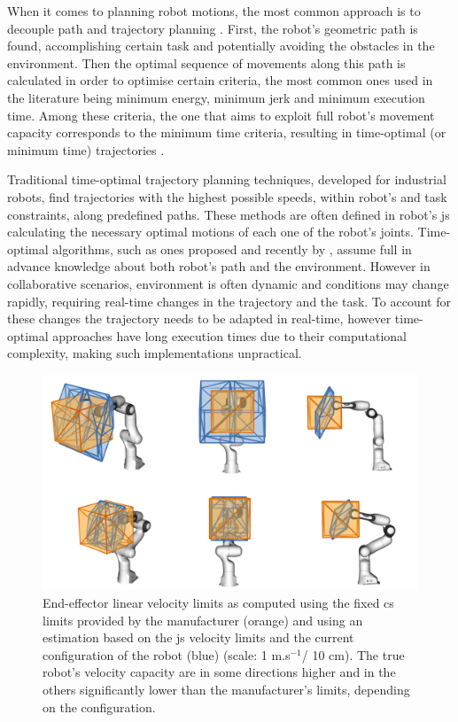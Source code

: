 
When it comes to planning robot motions, the most common approach is to decouple path and trajectory planning \cite{Pardo1996}. First, the robot's geometric path is found, accomplishing certain task and potentially avoiding the obstacles in the environment. Then the optimal sequence of movements along this path is calculated in order to optimise certain criteria, the most common ones used in the literature being minimum energy, minimum jerk and minimum execution time. Among these criteria, the one that aims to exploit full robot's movement capacity corresponds to the minimum time criteria, resulting in time-optimal (or minimum time) trajectories \cite{Gasparetto2012}. 

Traditional time-optimal trajectory planning techniques, developed for industrial robots, find trajectories with the highest possible speeds, within robot's and task constraints, along predefined paths. These methods are often defined in robot's \gls{js} calculating the necessary optimal motions of each one of the robot's joints. Time-optimal algorithms, such as ones proposed \citet{bobrow1985time} and recently by \citet{Pham2018}, assume full in advance knowledge about both robot's path and the environment. However in collaborative scenarios, environment is often dynamic and conditions may change rapidly, requiring real-time changes in the trajectory and the task. To account for these changes the trajectory needs to be adapted in real-time, however time-optimal approaches have long execution times due to their computational complexity, making such implementations unpractical. 


\begin{figure}[!t]
    \centering
    \includegraphics[width=0.8\linewidth]{Papers/imgs/comp_poly2.png}
    \caption{End-effector linear velocity limits as computed using the fixed \gls{cs} limits provided by the manufacturer (orange) and using an estimation based on the \gls{js} velocity limits and the current configuration of the robot (blue) (scale: 1 m.s$^{-1}$/ 10 cm). The true robot's velocity capacity are in some directions higher and in the others significantly lower than the manufacturer's limits, depending on the configuration.}
    \label{fig:comp_cube_poly}
\end{figure}



